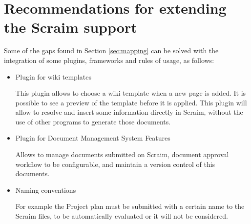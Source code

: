 \section{Recommendations for extending the Scraim support}

Some of the gaps found in Section \ref{sec:mapping} can be solved with the integration of some plugins, frameworks and rules of usage, as follows:

\begin{itemize}
	\item Plugin for wiki templates \citep{wikitemplates}
	
	This plugin allows to choose a wiki template when a new page is added. It is possible to see a preview of the template before it is applied.
	This plugin will allow to resolve and insert some information directly in Scraim, without the use of other programs to generate those documents.
	
	\item Plugin for Document Management System Features \citep{DMSF}
	
	Allows to manage documents submitted on Scraim, document approval workflow to be configurable, and maintain a version control of this documents.
	
	\item Naming conventions
	
	For example the Project plan must be submitted with a certain name to the Scraim files, to be automatically evaluated or it will not be considered.
	
\end{itemize}